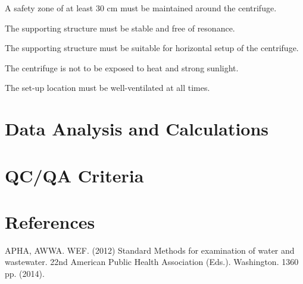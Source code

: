 \documentclass[12pt]{../SOP3_beta}
\begin{document}
\NP A safety zone of at least 30 cm must be maintained around the centrifuge.

\NP The supporting structure must be stable and free of resonance.


\NP The supporting structure must be suitable for horizontal setup of the centrifuge.

\NP The centrifuge is not to be exposed to heat and strong sunlight.

\NP The set-up location must be well-ventilated at all times.


\section{Data Analysis and Calculations}

\section{QC/QA Criteria}

\section{References}

\NP APHA, AWWA. WEF. (2012) Standard Methods for examination of water and wastewater. 22nd American Public Health Association (Eds.). Washington. 1360 pp. (2014).
\end{document}
